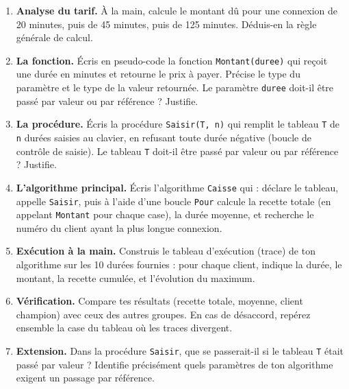 \documentclass[11pt]{article}
\newcounter{popsec}
\newcounter{popsub}
\newcommand{\courssub}[1]{%
  \stepcounter{popsub}%
  \par\vspace{9pt}\noindent{\popxbold\fontsize{11.5}{13}\selectfont\color{popink}{\color{poporange}\thepopsec.\thepopsub}\hspace{6pt}#1}\par\nopagebreak\vspace{4pt}
}
\begin{document}
\begin{enumerate}
\item \textbf{Analyse du tarif.} À la main, calcule le montant dû pour une connexion de 20 minutes, puis de 45 minutes, puis de 125 minutes. Déduis-en la règle générale de calcul.
\item \textbf{La fonction.} Écris en pseudo-code la fonction \texttt{Montant(duree)} qui reçoit une durée en minutes et retourne le prix à payer. Précise le type du paramètre et le type de la valeur retournée. Le paramètre \texttt{duree} doit-il être passé par valeur ou par référence ? Justifie.
\item \textbf{La procédure.} Écris la procédure \texttt{Saisir(T, n)} qui remplit le tableau \texttt{T} de \texttt{n} durées saisies au clavier, en refusant toute durée négative (boucle de contrôle de saisie). Le tableau \texttt{T} doit-il être passé par valeur ou par référence ? Justifie.
\item \textbf{L'algorithme principal.} Écris l'algorithme \texttt{Caisse} qui : déclare le tableau, appelle \texttt{Saisir}, puis à l'aide d'une boucle \texttt{Pour} calcule la recette totale (en appelant \texttt{Montant} pour chaque case), la durée moyenne, et recherche le numéro du client ayant la plus longue connexion.
\item \textbf{Exécution à la main.} Construis le tableau d'exécution (trace) de ton algorithme sur les 10 durées fournies : pour chaque client, indique la durée, le montant, la recette cumulée, et l'évolution du maximum.
\item \textbf{Vérification.} Compare tes résultats (recette totale, moyenne, client champion) avec ceux des autres groupes. En cas de désaccord, repérez ensemble la case du tableau où les traces divergent.
\item \textbf{Extension.} Dans la procédure \texttt{Saisir}, que se passerait-il si le tableau \texttt{T} était passé par valeur ? Identifie précisément quels paramètres de ton algorithme exigent un passage par référence.
\end{enumerate}

\courssub{Ressources à mobiliser}
\end{document}
